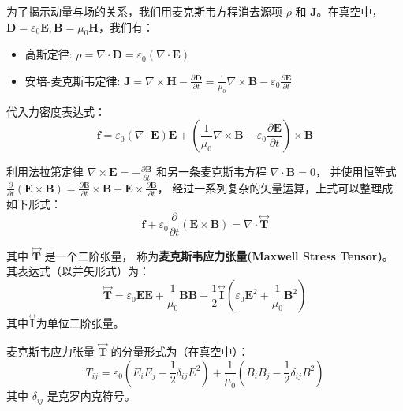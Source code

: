 \documentclass[fontset=none]{ctexart}
\begin{document}
为了揭示动量与场的关系，我们用麦克斯韦方程消去源项 $\rho$ 和 $\bm{J}$。在真空中，$\bm{D}=\varepsilon_0 \bm{E}, \bm{B}=\mu_0 \bm{H}$，我们有：
\begin{itemize}
    \item 高斯定律: $\rho = \nabla \cdot \bm{D} = \varepsilon_0 (\nabla \cdot \bm{E})$
    \item 安培-麦克斯韦定律: $\bm{J} = \nabla \times \bm{H} - \frac{\partial \bm{D}}{\partial t} = \frac{1}{\mu_0}\nabla \times \bm{B} - \varepsilon_0 \frac{\partial \bm{E}}{\partial t}$
\end{itemize}
代入力密度表达式：
\begin{equation}
    \bm{f} = \varepsilon_0 (\nabla \cdot \bm{E})\bm{E} + \left(\frac{1}{\mu_0}\nabla \times \bm{B} - \varepsilon_0 \frac{\partial \bm{E}}{\partial t}\right) \times \bm{B}
\end{equation}

利用法拉第定律 $\nabla \times \bm{E} = -\frac{\partial \bm{B}}{\partial t}$ 
和另一条麦克斯韦方程 $\nabla \cdot \bm{B} = 0$，
并使用恒等式 $\frac{\partial}{\partial t}(\bm{E} \times \bm{B}) 
= \frac{\partial \bm{E}}{\partial t} \times \bm{B} + \bm{E} \times \frac{\partial \bm{B}}{\partial t}$，
经过一系列复杂的矢量运算，上式可以整理成如下形式：
\begin{equation}
    \bm{f} + \varepsilon_0\frac{\partial}{\partial t}(\bm{E} \times \bm{B}) 
    = \nabla \cdot \overset{\leftrightarrow}{\bm{T}}
\end{equation}

其中 $\overset{\leftrightarrow}{\bm{T}}$ 是一个二阶张量，
称为\textbf{麦克斯韦应力张量(Maxwell Stress Tensor)}。
其表达式（以并矢形式）为：
\begin{equation}
    \overset{\leftrightarrow}{\bm{T}} 
    = \varepsilon_0 \bm{E}\bm{E} + \frac{1}{\mu_0}\bm{B}\bm{B} 
    - \frac{1}{2}\overset{\leftrightarrow}{\bm{I}}(\varepsilon_0 \bm{E}^2 + \frac{1}{\mu_0}\bm{B}^2)
\end{equation}
其中$\overset{\leftrightarrow}{\bm{I}}$为单位二阶张量。

\begin{definition}[麦克斯韦应力张量]
麦克斯韦应力张量 $\overset{\leftrightarrow}{\bm{T}}$ 的分量形式为（在真空中）：
\begin{equation}
    T_{ij} = \varepsilon_0 \left(E_i E_j - \frac{1}{2}\delta_{ij}E^2\right) + \frac{1}{\mu_0}\left(B_i B_j - \frac{1}{2}\delta_{ij}B^2\right)
\end{equation}
其中 $\delta_{ij}$ 是克罗内克符号。
\end{definition}
\end{document}
